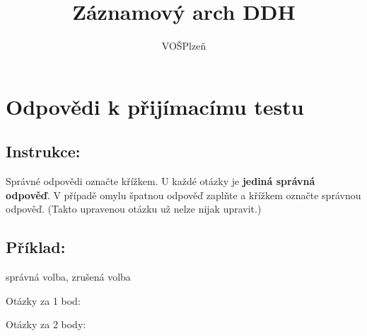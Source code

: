 \documentclass[
	13pt,
	a4paper,
	oneside]{sdapsclassic} %
\author{VOŠPlzeň}
\title{Záznamový arch DDH}
\begin{document}
    \begin{questionnaire}[noinfo]
    \begin{Form}

	\begin{multicols}{6}
	\end{multicols}
		
	

    \section{Odpovědi k přijímacímu testu}
    \subsection{Instrukce:}
    Správné odpovědi označte křížkem. U každé otázky je \textbf{jediná správná odpověď}. V případě omylu špatnou odpověď zaplňte a křížkem označte správnou odpověď. (Takto upravenou otázku už nelze nijak upravit.)
    \subsection{Příklad:}
    \checkedbox*{} správná volba,  \correctedbox*{} zrušená volba
    
    \medskip %


    \begin{multicols}{4}

        \begin{optiongroup}{Otázky za 1 bod:}
         \end{optiongroup}
        
	    \begin{optiongroup}{Otázky za 2 body:}
        \end{optiongroup}
        

\end{multicols}
\end{Form}
\end{questionnaire}
\end{document}
